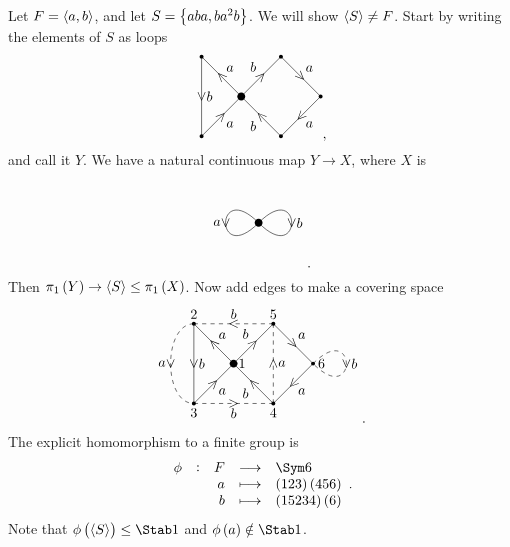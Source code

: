 \begin{example}
Let $ F = \left\langle a, b \right\rangle $, and let $ S = \cbr{aba, ba^2b} $. We will show $ \left\langle S \right\rangle \ne F $. Start by writing the elements of $ S $ as loops
$$
\begin{tikzpicture}
\fill (0, 0) circle (0.1);
\fill (-1, 1) circle (0.05);
\fill (-1, -1) circle (0.05);
\fill (1, -1) circle (0.05);
\fill (1, 1) circle (0.05);
\fill (2, 0) circle (0.05);
\draw (0, 0) to node{\rotatebox{45}{$ \wedge $}} node[above right]{$ a $} (-1, 1);
\draw (-1, 1) to node{$ \vee $} node[right]{$ b $} (-1, -1);
\draw (-1, -1) to node{\rotatebox{45}{$ > $}} node[below right]{$ a $} (0, 0);
\draw (0, 0) to node{\rotatebox{45}{$ > $}} node[above left]{$ b $} (1, 1);
\draw (1, 1) to node{\rotatebox{45}{$ \vee $}} node[above right]{$ a $} (2, 0);
\draw (2, 0) to node{\rotatebox{45}{$ < $}} node[below right]{$ a $} (1, -1);
\draw (1, -1) to node{\rotatebox{45}{$ \wedge $}} node[below left]{$ b $} (0, 0);
\end{tikzpicture},
$$
and call it $ Y $. We have a natural continuous map $ Y \to X $, where $ X $ is
$$
\begin{tikzpicture}
\fill (0, 0) circle (0.1);
\draw (0, 0) to [in=-135, out=135, distance=45] node{$ \vee $} node[left]{$ a $} (0, 0);
\draw (0, 0) to [in=-45, out=45, distance=45] node{$ \vee $} node[right]{$ b $} (0, 0);
\end{tikzpicture}.
$$
Then $ \pi_1\br{Y} \to \abr{S} \le \pi_1\br{X} $. Now add edges to make a covering space
$$
\begin{tikzpicture}
\fill (0, 0) circle (0.1) node[right]{$ 1 $};
\fill (-1, 1) circle (0.05) node[above]{$ 2 $};
\fill (-1, -1) circle (0.05) node[below]{$ 3 $};
\fill (1, -1) circle (0.05) node[below]{$ 4 $};
\fill (1, 1) circle (0.05) node[above]{$ 5 $};
\fill (2, 0) circle (0.05) node[right]{$ 6 $};
\draw (0, 0) to node{\rotatebox{45}{$ \wedge $}} node[above right]{$ a $} (-1, 1);
\draw (-1, 1) to node{$ \vee $} node[right]{$ b $} (-1, -1);
\draw (-1, -1) to node{\rotatebox{45}{$ > $}} node[below right]{$ a $} (0, 0);
\draw (0, 0) to node{\rotatebox{45}{$ > $}} node[above left]{$ b $} (1, 1);
\draw (1, 1) to node{\rotatebox{45}{$ \vee $}} node[above right]{$ a $} (2, 0);
\draw (2, 0) to node{\rotatebox{45}{$ < $}} node[below right]{$ a $} (1, -1);
\draw (1, -1) to node{\rotatebox{45}{$ \wedge $}} node[below left]{$ b $} (0, 0);
\draw [dashed] (-1, 1) to [in=180, out=180] node{$ \vee $} node[left]{$ a $} (-1, -1);
\draw [dashed] (1, -1) to node{$ \wedge $} node[right]{$ a $} (1, 1);
\draw [dashed] (1, 1) to node{$ < $} node[above]{$ b $} (-1, 1);
\draw [dashed] (-1, -1) to node{$ > $} node[below]{$ b $} (1, -1);
\draw [dashed] (2, 0) to [in=-45, out=45, distance=45] node{$ \vee $} node[right]{$ b $} (2, 0);
\end{tikzpicture}.
$$
The explicit homomorphism to a finite group is
$$ \functions[\phi]{F}{\Sym 6}{a}{\br{123}\br{456}}{b}{\br{15234}\br{6}}. $$
Note that $ \phi\br{\abr{S}} \le \Stab 1 $ and $ \phi\br{a} \notin \Stab 1 $.
\end{example}

